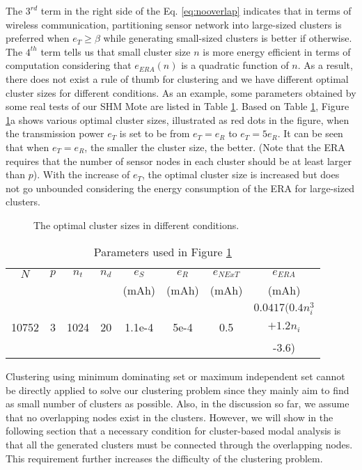 The \(3^{rd}\) term in the right side of the Eq. \ref{eq:nooverlap} indicates that in terms of wireless communication, partitioning sensor network into large-sized clusters is preferred when \(e_T \geq \beta\) while generating small-sized clusters is better if otherwise. The \(4^{th}\) term tells us that small cluster size \(n\) is more energy efficient in terms of computation considering that \(e_{ERA}(n)\) is a quadratic function of \(n\). As a result, there does not exist a rule of thumb for clustering and we have different optimal cluster sizes for different conditions. As an example, some parameters obtained by some real tests of our SHM Mote are listed in Table \ref{tab:Table2}. Based on Table \ref{tab:Table2}, Figure \ref{fig:MagicNumber2}a shows various optimal cluster sizes, illustrated as red dots in the figure, when the transmission power \(e_T\) is set to be from \(e_T = e_R\) to \(e_T = 5 e_R\). It can be seen that when \(e_T=e_R\), the smaller the cluster size, the better. (Note that the ERA requires that the number of sensor nodes in each cluster should be at least larger than \(p\)). With the increase of \(e_T\), the optimal cluster size is increased but does not go unbounded considering the energy consumption of the ERA for large-sized clusters.

\begin{figure}
	\centering
	\caption{The optimal cluster sizes in different conditions.}
	\label{fig:MagicNumber2}
\end{figure}


\begin{table}
	\centering
\begin{tabular}{|c|c|c|c|c|c|c|c|}
\hline
\(N\)&\(p\)&\(n_t\)&\(n_d\)&\(e_S\)&\(e_R\)&\(e_{NExT}\)&\(e_{ERA}\)\\
& & & &(mAh)&(mAh)&(mAh)&(mAh)\\
\hline
     &     &       &       &       &   & &\(0.0417(0.4n_i^3\)\\
10752&3&1024&20&1.1e-4&5e-4&0.5&\(+1.2n_i\)\\
&&&&&&&-3.6)\\
\hline
\end{tabular}
	\caption{Parameters used in Figure \ref{fig:MagicNumber2}}
	\label{tab:Table2}
\end{table}

Clustering using minimum dominating set \cite{wan2004distributed} or maximum independent set 
\cite{banerjee2001clustering} cannot be directly applied to solve our clustering problem since they mainly aim to find as small number of clusters as possible. Also, in the discussion so far, we assume that no overlapping nodes exist in the clusters. However, we will show in the following section that a necessary condition for cluster-based modal analysis is that all the generated clusters must be connected through the overlapping nodes. This requirement further increases the difficulty of the clustering problem.

